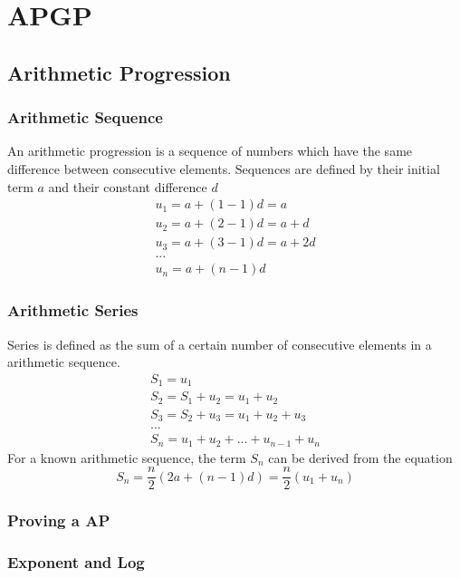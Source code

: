 \documentclass[../main]{subfiles}
\begin{document}
\section{APGP}

\subsection{Arithmetic Progression}

	\subsubsection{Arithmetic Sequence}
	An arithmetic progression is a sequence of numbers which have the same difference between consecutive elements. Sequences are defined by their initial term \(a\) and their constant difference \(d\)
	\begin{equation*} \begin{gathered}
		u_1 = a + (1-1) d = a\\
		u_2 = a + (2-1) d = a + d \\
		u_3 = a + (3-1) d = a + 2d \\
		...\\
		u_n = a + (n-1) d 
	\end{gathered} \end{equation*} 
	\subsubsection{Arithmetic Series}
	Series is defined as the sum of a certain number of consecutive elements in a arithmetic sequence.
	\begin{equation*} \begin{gathered}
		S_1 = u_1 \\
		S_2 = S_1 + u_2 = u_1 + u_2 \\
		S_3 = S_2 + u_3 = u_1 + u_2 + u_3 \\
		... \\
		S_n = u_1 + u_2 + ... + u_{n-1} + u_n
	\end{gathered} \end{equation*} 
	For a known arithmetic sequence, the term \(S_n\) can be derived from the equation
	\[ S_n = \frac{n}{2}(2a + (n-1)d) = \frac{n}{2}(u_1 + u_n) \]
	\subsubsection{Proving a AP}
	\subsubsection{Exponent and Log}
\end{document}
